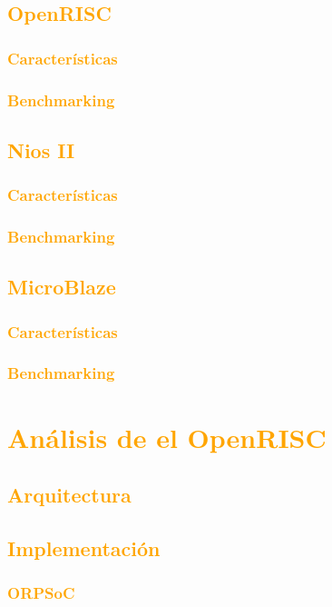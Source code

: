 \documentclass[a4paper,11pt]{article}
\begin{document}
	\subsection{\textcolor{orange}{OpenRISC}}
		\subsubsection{\textcolor{orange}{Características}}
		\subsubsection{\textcolor{orange}{Benchmarking}}
	\subsection{\textcolor{orange}{Nios II}}
		\subsubsection{\textcolor{orange}{Características}}
		\subsubsection{\textcolor{orange}{Benchmarking}}
	\subsection{\textcolor{orange}{MicroBlaze}}
		\subsubsection{\textcolor{orange}{Características}}
		\subsubsection{\textcolor{orange}{Benchmarking}}

\section{\textcolor{orange}{Análisis de el OpenRISC }}
		\subsection{\textcolor{orange}{Arquitectura}}
		\subsection{\textcolor{orange}{Implementación}}
			\subsubsection{\textcolor{orange}{ORPSoC}}
\end{document}
